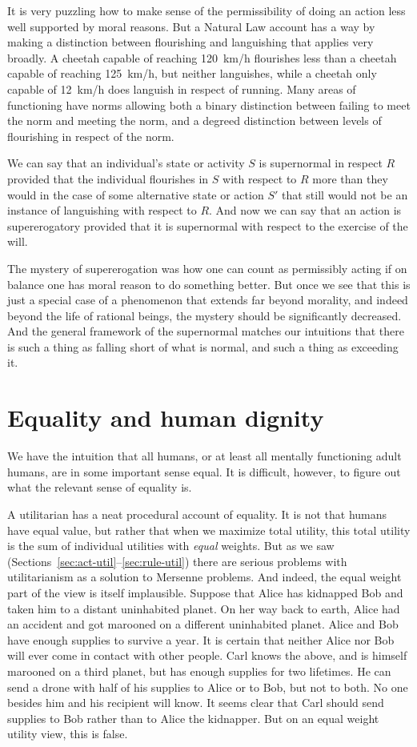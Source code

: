 It is very puzzling how to make sense of the permissibility of doing an action less well supported by moral reasons. 
But a Natural Law account has a way by making a distinction between flourishing and languishing that applies very
broadly. A cheetah capable of reaching 120~km/h flourishes less than a cheetah capable of reaching 125~km/h, but 
neither languishes, while a cheetah only capable of 12~km/h does languish in respect of running. Many areas of 
functioning have norms allowing both a binary distinction between failing to meet the norm and meeting the norm,
and a degreed distinction between levels of flourishing in respect of the norm. 

We can say that an individual's state or activity $S$ is supernormal in respect $R$ provided that the individual flourishes 
in $S$ with respect to $R$ more than they would in the case of some alternative state or action $S'$ that
still would not be an instance of languishing with respect to $R$. And now we can say that an action is supererogatory
provided that it is supernormal with respect to the exercise of the will. 

The mystery of supererogation was how one can count as permissibly acting if on balance one has moral reason to do something 
better. But once we see that this is just a special case of a phenomenon that extends far beyond morality, and indeed beyond
the life of rational beings, the mystery should be significantly decreased. And the general framework of the supernormal
matches our intuitions that there is such a thing as falling short of what is normal, and such a thing as exceeding it.

\section{Equality and human dignity}
We have the intuition that all humans, or at least all mentally functioning adult humans, are in some important sense 
equal. It is difficult, however, to figure out what the relevant sense of equality is.

A utilitarian has a neat procedural account of equality. It is not that humans have equal value, but rather
that when we maximize total utility, this total utility is the sum of
individual utilities with \textit{equal} weights. But as we saw (Sections~\ref{sec:act-util}--\ref{sec:rule-util}) there are serious problems with
utilitarianism as a solution to Mersenne problems. And indeed, the equal weight part of the view is itself implausible. Suppose that 
Alice has kidnapped Bob and taken him to a distant uninhabited planet. On her way back to earth, Alice 
had an accident and got marooned on a different uninhabited planet. Alice and Bob have enough supplies to
survive a year. It is certain that neither Alice nor Bob will ever come in contact with other people. 
Carl knows the above, and is himself marooned on a third planet, but has enough 
supplies for two lifetimes. He can send a drone with half of his supplies to Alice or to Bob, but not to
both. No one besides him and his recipient will know. It seems clear that Carl should send supplies to
Bob rather than to Alice the kidnapper. But on an equal weight utility view, this is false.

